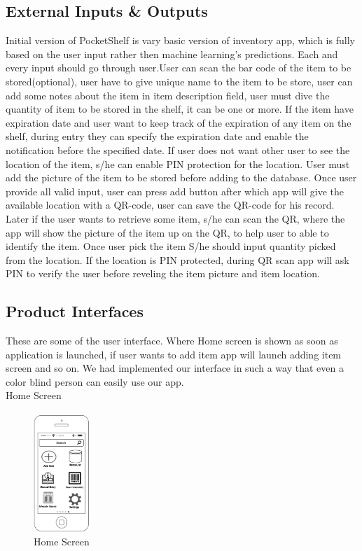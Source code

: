 \subsection{External Inputs \& Outputs}
 Initial version of PocketShelf is vary basic version of inventory app, which is fully based on the user input rather then machine learning's predictions. Each and every input should go through user.User can scan the bar code of the item to be stored(optional), user have to give unique name to the item to be store, user can add some notes about the item in item description field, user must dive the quantity of item to be stored in the shelf, it can be one or more. If the item have expiration date and user want to keep track of the expiration of any item on the shelf, during entry they can specify the expiration date and enable the notification before the specified date. If user does not want other user to see the location of the item, s/he can enable PIN protection for the location. User must add the picture of the item to be stored before adding to the database. Once user provide all valid input, user can press add button after which app will give the available location with a QR-code, user can save the QR-code for his record. Later if the user wants to retrieve some item, s/he can scan the QR, where the app will show the picture of the item up on the QR, to help user to able to identify the item. Once user pick the item S/he should input quantity picked from the location. If the location is PIN protected, during QR scan app will ask PIN to verify the user before reveling the item picture and item location. 
\pagebreak

\subsection{Product Interfaces}
These are some of the user interface. Where Home screen is shown as soon as application is launched, if user wants to add item app will launch adding item screen and so on. We had implemented our interface in such a way that even a color blind person can easily use our app.
\\Home Screen
\begin{figure}[h!]
                	\centering
                   	\includegraphics[width=0.19\textwidth]{images/home}
                    \caption{Home Screen}
                \end{figure}

